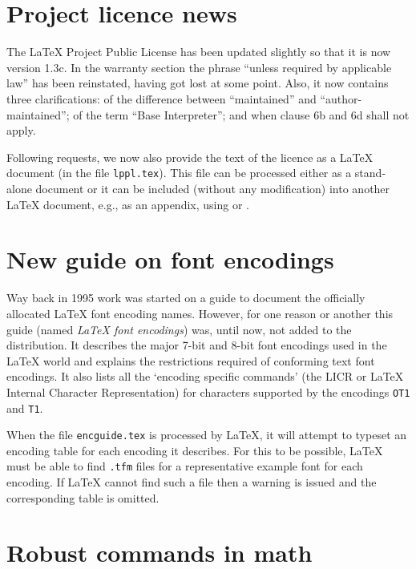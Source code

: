 \documentclass{ltnews}
\providecommand\file[1]{\texttt{#1}}
\begin{document}
\maketitle


\section{Project licence news}

The \LaTeX{} Project Public License has been updated slightly so that
it is now version 1.3c.  In the warranty section the
phrase ``unless required by applicable law'' has been reinstated,
having got lost at some point.  Also,
it now contains three clarifications: of the difference between
``maintained'' and ``author-maintained''; of the
term ``Base Interpreter''; and when clause 6b and 6d shall not apply.

Following requests, we now also provide the text of the licence as a
\LaTeX{} document (in the file \texttt{lppl.tex}). This file can be
processed either as a stand-alone document or it can be included
(without any modification) into another \LaTeX{} document, e.g., as an
appendix, using \verb|| or \verb||.


\section{New guide on font encodings}

Way back in 1995 work was started on a guide to document the
officially allocated \LaTeX{} font encoding names. However, for one
reason or another this guide (named \textit{\LaTeX{} font encodings})
was, until now, not added to the distribution.  It describes the major
7-bit and 8-bit font encodings used in the \LaTeX{} world and explains
the restrictions required of conforming text font encodings.  It also
lists all the `encoding specific commands' (the LICR or \LaTeX{}
Internal Character Representation) for characters supported by the
encodings \texttt{OT1} and \texttt{T1}.

When the file \file{encguide.tex} is processed by \LaTeX{}, it will
attempt to typeset an encoding table for each encoding it describes.
For this to be possible, \LaTeX{} must be able to find \texttt{.tfm}
files for a representative example font for each encoding.  If
\LaTeX{} cannot find such a file then a warning is issued and the
corresponding table is omitted.


\section{Robust commands in math}
\end{document}
